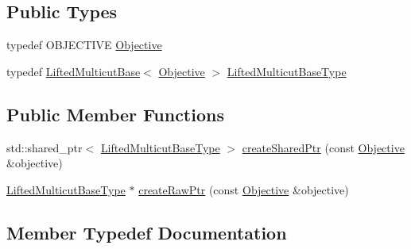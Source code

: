 \subsection*{Public Types}
\begin{DoxyCompactItemize}
\item 
typedef O\+B\+J\+E\+C\+T\+I\+V\+E \hyperlink{classnifty_1_1graph_1_1optimization_1_1lifted__multicut_1_1PyLiftedMulticutFactoryBase_a9a92b50b7c90ffcdeb1510e5f6a59a56}{Objective}
\item 
typedef \hyperlink{classnifty_1_1graph_1_1optimization_1_1lifted__multicut_1_1LiftedMulticutBase}{Lifted\+Multicut\+Base}$<$ \hyperlink{classnifty_1_1graph_1_1optimization_1_1lifted__multicut_1_1PyLiftedMulticutFactoryBase_a9a92b50b7c90ffcdeb1510e5f6a59a56}{Objective} $>$ \hyperlink{classnifty_1_1graph_1_1optimization_1_1lifted__multicut_1_1PyLiftedMulticutFactoryBase_a601d7d3a4a518fa5eeb7dbc36de890e5}{Lifted\+Multicut\+Base\+Type}
\end{DoxyCompactItemize}
\subsection*{Public Member Functions}
\begin{DoxyCompactItemize}
\item 
std\+::shared\+\_\+ptr$<$ \hyperlink{classnifty_1_1graph_1_1optimization_1_1lifted__multicut_1_1LiftedMulticutFactoryBase_adbe8507647f54608c03ce04b42742414}{Lifted\+Multicut\+Base\+Type} $>$ \hyperlink{classnifty_1_1graph_1_1optimization_1_1lifted__multicut_1_1PyLiftedMulticutFactoryBase_a58d0472e986c8e3d1edeca05099c034e}{create\+Shared\+Ptr} (const \hyperlink{classnifty_1_1graph_1_1optimization_1_1lifted__multicut_1_1PyLiftedMulticutFactoryBase_a9a92b50b7c90ffcdeb1510e5f6a59a56}{Objective} \&objective)
\item 
\hyperlink{classnifty_1_1graph_1_1optimization_1_1lifted__multicut_1_1LiftedMulticutFactoryBase_adbe8507647f54608c03ce04b42742414}{Lifted\+Multicut\+Base\+Type} $\ast$ \hyperlink{classnifty_1_1graph_1_1optimization_1_1lifted__multicut_1_1PyLiftedMulticutFactoryBase_aab6abcdf1cf2bc357a97c295b246dece}{create\+Raw\+Ptr} (const \hyperlink{classnifty_1_1graph_1_1optimization_1_1lifted__multicut_1_1PyLiftedMulticutFactoryBase_a9a92b50b7c90ffcdeb1510e5f6a59a56}{Objective} \&objective)
\end{DoxyCompactItemize}


\subsection{Member Typedef Documentation}
\hypertarget{classnifty_1_1graph_1_1optimization_1_1lifted__multicut_1_1PyLiftedMulticutFactoryBase_a601d7d3a4a518fa5eeb7dbc36de890e5}{}
